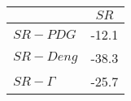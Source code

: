 \begin{tabular}{l|c}
\toprule
{} &  $SR$ \\
\midrule
\textbf{$SR-PDG$   } & -12.1 \\
\textbf{$SR-Deng$  } & -38.3 \\
\textbf{$SR-\Gamma$} & -25.7 \\
\bottomrule
\end{tabular}
